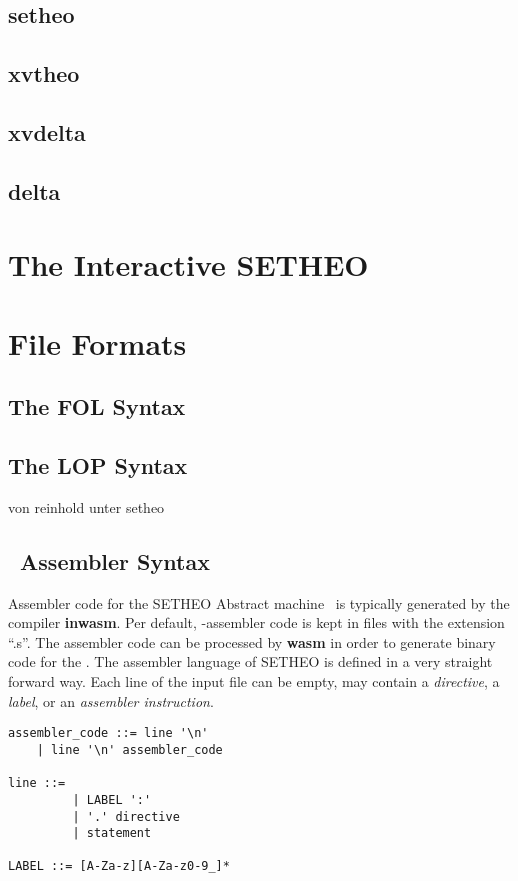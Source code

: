 \section{setheo}
\section{xvtheo}
\section{xvdelta}
\section{delta}

\chapter{The Interactive SETHEO}

\chapter{File Formats}
\section{The FOL Syntax}

\section{The LOP Syntax}
\label{sec:lop}   %
von reinhold unter setheo


\section{\SAM\ Assembler Syntax}
Assembler code for the SETHEO Abstract machine \SAM\ is typically
generated by the compiler {\bf inwasm}. Per default, \SAM-assembler
code is kept in files with the extension ``.s''. The assembler code
can be processed by {\bf wasm} in order to generate binary code for the
\SAM.
The assembler language of SETHEO is defined in a very straight forward
way. Each line of the input file can be empty, may contain
a {\em directive\/}, a {\em label}, or an {\em assembler instruction}.

\begin{verbatim}
assembler_code ::= line '\n'
	| line '\n' assembler_code

line ::= 
         | LABEL ':' 
         | '.' directive
         | statement 

LABEL ::= [A-Za-z][A-Za-z0-9_]*
\end{verbatim}

